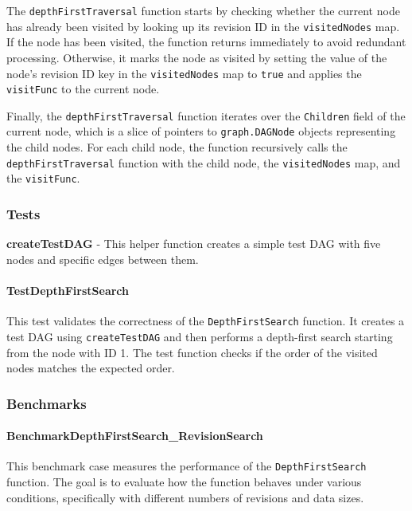 The \lstinline{depthFirstTraversal} function starts by checking whether the current node has already been visited by looking up its revision ID in the \lstinline{visitedNodes} map. If the node has been visited, the function returns immediately to avoid redundant processing. Otherwise, it marks the node as visited by setting the value of the node's revision ID key in the \lstinline{visitedNodes} map to \lstinline{true} and applies the \lstinline{visitFunc} to the current node.
\smallskip

Finally, the \lstinline{depthFirstTraversal} function iterates over the \lstinline{Children} field of the current node, which is a slice of pointers to \lstinline{graph.DAGNode} objects representing the child nodes. For each child node, the function recursively calls the \lstinline{depthFirstTraversal} function with the child node, the \lstinline{visitedNodes} map, and the \lstinline{visitFunc}.

\subsubsection{Tests}
\textbf{createTestDAG} - This helper function creates a simple test DAG with five nodes and specific edges between them.

\paragraph{TestDepthFirstSearch}
This test validates the correctness of the \lstinline{DepthFirstSearch} function. It creates a test DAG using \lstinline{createTestDAG} and then performs a depth-first search starting from the node with ID 1. The test function checks if the order of the visited nodes matches the expected order.

\subsubsection{Benchmarks}

\paragraph{BenchmarkDepthFirstSearch\_RevisionSearch}
This benchmark case measures the performance of the \lstinline{DepthFirstSearch} function. The goal is to evaluate how the function behaves under various conditions, specifically with different numbers of revisions and data sizes.


